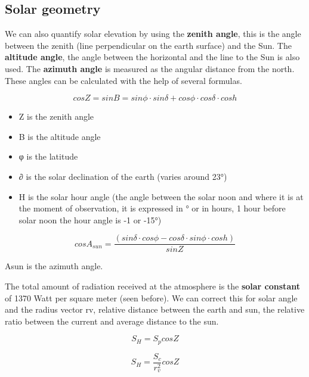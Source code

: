 \documentclass[oneside]{book}
\providecommand{\tightlist}{%
  \setlength{\itemsep}{0pt}\setlength{\parskip}{0pt}}
\begin{document}
\subsection{Solar geometry}\label{solar-geometry}

We can also quantify solar elevation by using the \textbf{zenith angle},
this is the angle between the zenith (line perpendicular on the earth
surface) and the Sun. The \textbf{altitude angle}, the angle between the
horizontal and the line to the Sun is also used. The \textbf{azimuth
angle} is measured as the angular distance from the north. These angles
can be calculated with the help of several formulas.

\begin{equation} 
  cos Z = sin B = sin \phi \cdot sin \delta + cos \phi \cdot cos \delta \cdot cos h
   \label{eq:Eqangles}
\end{equation}

\begin{itemize}
\tightlist
\item
  Z is the zenith angle
\item
  B is the altitude angle
\item
  φ is the latitude
\item
  ∂ is the solar declination of the earth (varies around 23°)
\item
  H is the solar hour angle (the angle between the solar noon and where
  it is at the moment of observation, it is expressed in ° or in hours,
  1 hour before solar noon the hour angle is -1 or -15°)
\end{itemize}

\begin{equation} 
  cos A_{sun} = \frac{\left(sin \delta \cdot cos \phi - cos \delta \cdot sin \phi \cdot cos h \right)} {sin Z}
   \label{eq:EqAsun}
\end{equation}

Asun is the azimuth angle.

The total amount of radiation received at the atmosphere is the
\textbf{solar constant} of 1370 Watt per square meter (seen before). We
can correct this for solar angle and the radius vector rv, relative
distance between the earth and sun, the relative ratio between the
current and average distance to the sun.

\begin{equation} 
   S_H = S_p cos Z
   \label{eq:Eqdist1}
\end{equation}

\begin{equation} 
   S_H = \frac{S_c}{r_v^{2}} cos Z
   \label{eq:Eqdist2}
\end{equation}
\end{document}
